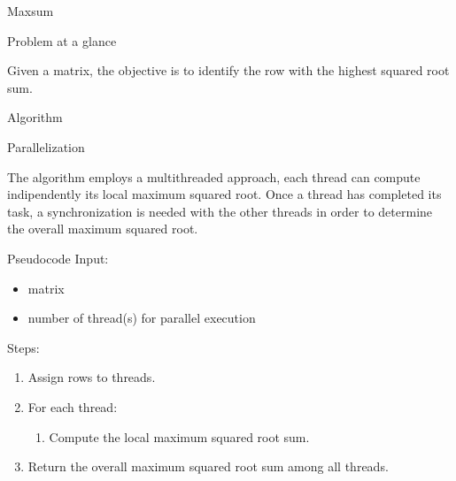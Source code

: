 \begin{chapter}{Maxsum}
    \begin{section}{Problem at a glance}
        \par Given a matrix, the objective is to identify the row with the highest squared root sum.
    \end{section}
    \begin{section}{Algorithm}
        \begin{subsection}{Parallelization}
            \par The algorithm employs a multithreaded approach, each thread can compute indipendently its local maximum squared root. Once a thread has completed its task, a synchronization is needed with the other threads in order to determine the overall maximum squared root.
        \end{subsection}
        \begin{subsection}{Pseudocode}
            Input:
            \begin{itemize}
                \item matrix
                \item number of thread(s) for parallel execution
            \end{itemize}
            Steps:
            \begin{enumerate}
                \item Assign rows to threads.
                \item For each thread:
                \begin{enumerate}
                    \item Compute the local maximum squared root sum.
                \end{enumerate}
                \item Return the overall maximum squared root sum among all threads.
            \end{enumerate}
            
        \end{subsection}
    \end{section}
\end{chapter}